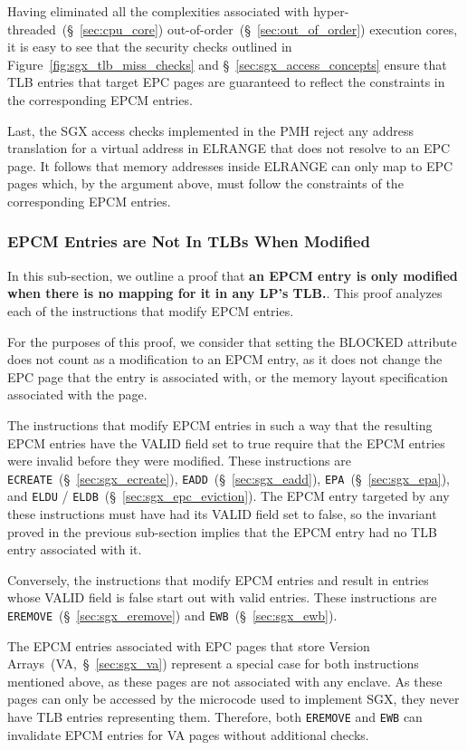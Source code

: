 Having eliminated all the complexities associated with
hyper-threaded~(\S~\ref{sec:cpu_core}) out-of-order~(\S~\ref{sec:out_of_order})
execution cores, it is easy to see that the security checks outlined in
Figure~\ref{fig:sgx_tlb_miss_checks} and \S~\ref{sec:sgx_access_concepts}
ensure that TLB entries that target EPC pages are guaranteed to reflect the
constraints in the corresponding EPCM entries.

Last, the SGX access checks implemented in the PMH reject any address
translation for a virtual address in ELRANGE that does not resolve to an EPC
page. It follows that memory addresses inside ELRANGE can only map to EPC
pages which, by the argument above, must follow the constraints of the
corresponding EPCM entries.


\subsubsection{EPCM Entries are Not In TLBs When Modified}

In this sub-section, we outline a proof that \textbf{an EPCM entry is only
modified when there is no mapping for it in any LP's TLB.}. This proof analyzes
each of the instructions that modify EPCM entries.

For the purposes of this proof, we consider that setting the BLOCKED attribute
does not count as a modification to an EPCM entry, as it does not change the
EPC page that the entry is associated with, or the memory layout specification
associated with the page.

The instructions that modify EPCM entries in such a way that the resulting EPCM
entries have the VALID field set to true require that the EPCM entries were
invalid before they were modified. These instructions are
\texttt{ECREATE}~(\S~\ref{sec:sgx_ecreate}),
\texttt{EADD}~(\S~\ref{sec:sgx_eadd}), \texttt{EPA}~(\S~\ref{sec:sgx_epa}),
and \texttt{ELDU} / \texttt{ELDB}~(\S~\ref{sec:sgx_epc_eviction}). The EPCM
entry targeted by any these instructions must have had its VALID field set to
false, so the invariant proved in the previous sub-section implies that the
EPCM entry had no TLB entry associated with it.

Conversely, the instructions that modify EPCM entries and result in entries
whose VALID field is false start out with valid entries. These instructions are
\texttt{EREMOVE}~(\S~\ref{sec:sgx_eremove}) and
\texttt{EWB}~(\S~\ref{sec:sgx_ewb}).

The EPCM entries associated with EPC pages that store Version
Arrays~(VA,~\S~\ref{sec:sgx_va}) represent a special case for both instructions
mentioned above, as these pages are not associated with any enclave. As these
pages can only be accessed by the microcode used to implement SGX, they never
have TLB entries representing them. Therefore, both \texttt{EREMOVE} and
\texttt{EWB} can invalidate EPCM entries for VA pages without additional
checks.

